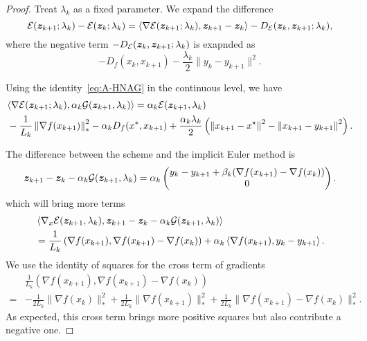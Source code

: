 \documentclass[10pt]{amsart}
\begin{document}
\begin{proof}
Treat $\lambda_k$ as a fixed parameter. We expand the difference
\begin{equation}\label{eq:Elambda}
\mathcal E(\boldsymbol z_{k+1}; \lambda_{k}) - \mathcal E(\boldsymbol z_k; \lambda_k) = \langle \nabla \mathcal E(\boldsymbol z_{k+1}; \lambda_{k}), \boldsymbol z_{k+1} - \boldsymbol z_k \rangle - D_{\mathcal E}(\boldsymbol z_k, \boldsymbol z_{k+1};\lambda_k),
\end{equation}
where the negative term $- D_{\mathcal E}(\boldsymbol z_k, \boldsymbol z_{k+1};\lambda_k)$ is exapnded as
$$
- D_f(x_k, x_{k+1}) - \frac{\lambda_k}{2}\| y_{k} - y_{k+1}\|^2.
$$

Using the identity~\eqref{eq:A-HNAG} in the continuous level, we have
$$
\begin{aligned}
&\langle \nabla \mathcal E(\boldsymbol z_{k+1}; \lambda_{k}), \alpha_k \mathcal G(\boldsymbol z_{k+1}, \lambda_k) \rangle = \alpha_k \mathcal E(\boldsymbol z_{k+1}, \lambda_k)\\
&  - \frac{1}{L_k} \left\lVert {\nabla f(x_{k+1})} \right\rVert_*^2  - \alpha_k D_f(x^*, x_{k+1}) + \frac{\alpha_k\lambda_k} {2}\left (\left\lVert {x_{k+1}-x^{\star}} \right\rVert^2 - \left\lVert {x_{k+1}-y_{k+1}} \right\rVert^2\right ).	
\end{aligned}
$$

The difference between the scheme and the implicit Euler method is
$$
\boldsymbol z_{k+1} - \boldsymbol z_k - \alpha_k \mathcal G(\boldsymbol z_{k+1}, \lambda_k) = \alpha_k 
\begin{pmatrix}
 y_k - y_{k+1} + \beta_k (\nabla f(x_{k+1}) - \nabla f(x_{k}))\\
0
\end{pmatrix}.
$$
which will bring more terms
	\begin{align*}
&		\left\langle {\nabla_x \mathcal E(\boldsymbol z_{k+1}, \lambda_{k}), \boldsymbol z_{k+1} - \boldsymbol z_k - \alpha_k \mathcal G(\boldsymbol z_{k+1}, \lambda_k)} \right\rangle \\
		&= \frac{1}{L_k} \left ( \nabla f(x_{k+1}) , \nabla f(x_{k+1}) - \nabla f(x_k)\right )+\alpha_k \left\langle {\nabla f(x_{k+1}), y_k - y_{k+1}} \right\rangle.
	\end{align*}
	We use the identity of squares for the cross term of gradients
	\begin{align*}
		&\frac{1}{L_k}( \nabla f(x_{k+1}) , \nabla f(x_{k+1}) - \nabla f(x_k)) \\
		= & - \frac{1}{2L_k}\| \nabla f(x_{k})\|_*^2
		+ \frac{1}{2L_k}\| \nabla f(x_{k+1})\|_*^2 + \frac{1}{2L_k}\| \nabla f(x_{k+1}) - \nabla f(x_k) \|_*^2.
	\end{align*}
As expected, this cross term brings more positive squares but also contribute a negative one.


\end{proof}
\end{document}
